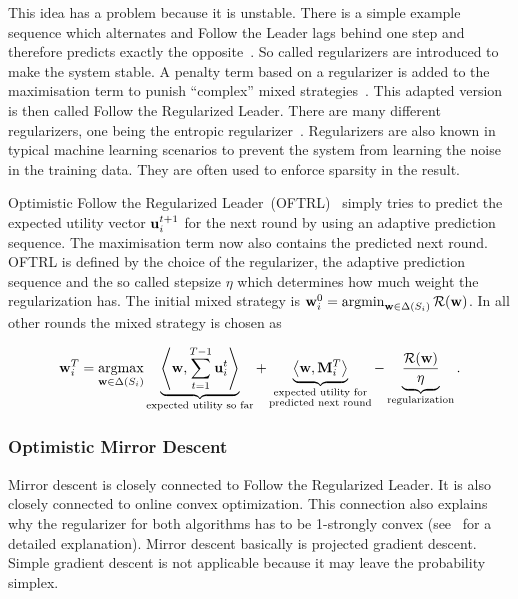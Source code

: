 \documentclass[a4paper]{article}
\theoremstyle{definition}
\newcommand{\mst}{\ensuremath{w}}
\newcommand{\mR}{\ensuremath{\mathcal{R}}}
\renewcommand{\vec}[1]{\ensuremath{{\bf #1}}}
\newcommand{\dotp}[2]{\ensuremath{\left\langle #1, #2 \right\rangle}}
\DeclareMathOperator*{\argmax}{argmax}
\DeclareMathOperator*{\argmin}{argmin}
\begin{document}
This idea has a problem because it is unstable.
There is a simple example sequence which alternates and Follow the
Leader lags behind one step and therefore predicts exactly the
opposite~\cite[p.127, Example 2.2]{Foundations}.
So called regularizers are introduced to make the system stable.
A penalty term based on a regularizer is added to the
maximisation term to punish \enquote{complex}
mixed strategies~\cite[p.89]{schoelkopf2002learning}.
This adapted version is then called Follow the Regularized Leader.
There are many different regularizers, one being the entropic
regularizer~\cite[p.136, Example 2.5]{Foundations}.
Regularizers are also known in typical machine learning scenarios to
prevent the system from learning the noise in the training data.
They are often used to enforce sparsity in the result.

Optimistic Follow the Regularized Leader~(OFTRL)~\cite{OMD} simply tries to predict the
expected utility vector $\vec{u}_i^{t+1}$ for the next round by using
an adaptive prediction sequence.
The maximisation term now also contains the
predicted next round.
OFTRL is defined by the choice of the regularizer, the adaptive
prediction sequence and the so called stepsize $\eta$ which determines how
much weight the regularization has.
The initial mixed strategy is $\vec{\mst}_i^0
= \argmin_{\vec{\mst}\in \Delta(S_i)} \mR(\vec{\mst})$.
In all other rounds the mixed strategy is chosen as

\begin{equation*}
 \vec{\mst}_i^T
 = \argmax_{ \vec{\mst} \in \Delta(S_i)}  \underbrace{\dotp{\vec{\mst}}{\sum_{t=1}^{T-1} \vec{u}_i^t
   }}_{\text{expected utility so far}} 
 +  \underbrace{\dotp{\vec{\mst}}{\vec{M}_i^T}}_{\substack{\text{expected
     utility for}\\ \text{predicted next round}}}
 -  \underbrace{\frac{\mR(\vec{\mst})}{\eta}}_{\text{regularization}}.
\end{equation*}


\subsubsection{Optimistic Mirror Descent}
\label{sec:optim-mirr-desc}

Mirror descent is closely connected to Follow the Regularized Leader.
It is also closely connected to online convex optimization.
This connection also explains why the regularizer for both algorithms
has to be 1-strongly convex (see~\cite{Foundations} for a detailed explanation).
Mirror descent basically is projected gradient descent.
Simple gradient descent is not applicable because it may leave the
probability simplex.
\end{document}
